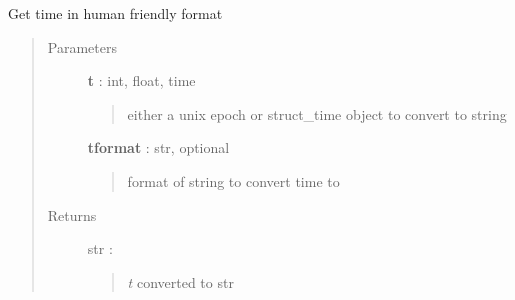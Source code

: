 \documentclass[letterpaper,10pt,english]{sphinxmanual}
\begin{document}

\begin{fulllineitems}
\label{pytan.utils:pytan.utils.human_time}
Get time in human friendly format
\begin{quote}\begin{description}
\item[{Parameters}] \leavevmode
\textbf{t} : int, float, time
\begin{quote}

either a unix epoch or struct\_time object to convert to string
\end{quote}

\textbf{tformat} : str, optional
\begin{quote}

format of string to convert time to
\end{quote}

\item[{Returns}] \leavevmode
str :
\begin{quote}

\emph{t} converted to str
\end{quote}

\end{description}\end{quote}

\end{fulllineitems}

\end{document}

